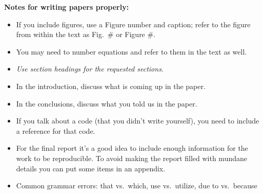 \textbf{Notes for writing papers properly:}
\begin{itemize}
\item If you include figures, use a Figure number and caption; refer to the figure from within the text as Fig.\ \# or Figure \#.
\item You may need to number equations and refer to them in the text as well.
\item \textit{Use section headings for the requested sections.}
\item In the introduction, discuss what is coming up in the paper. 
\item In the conclusions, discuss what you told us in the paper.
\item If you talk about a code (that you didn't write yourself), you need to include a reference for that code. 
\item For the final report it's a good idea to include enough information for the work to be reproducible. To avoid making the report filled with mundane details you can put some items in an appendix.
\item Common grammar errors: that vs.\ which, use vs.\ utilize, due to vs.\ because
\end{itemize}